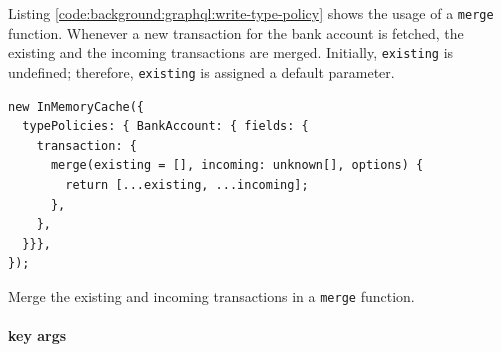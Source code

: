\bigskip

\noindent Listing \ref{code:background:graphql:write-type-policy} shows the usage of a \texttt{merge} function. Whenever a new transaction for the bank account is fetched, the existing and the incoming transactions are merged. Initially, \texttt{existing} is undefined; therefore, \texttt{existing} is assigned a default parameter.

\ifshowListings
\begin{listing}[H]
    \begin{verbatim}
new InMemoryCache({
  typePolicies: { BankAccount: { fields: {
    transaction: {
      merge(existing = [], incoming: unknown[], options) {
        return [...existing, ...incoming];
      },
    },
  }}},
});
    \end{verbatim}
    \caption{Merge the existing and incoming transactions in a \texttt{merge} function.}\label{code:background:graphql:write-type-policy}
\end{listing}
\fi

\paragraph{key args}
